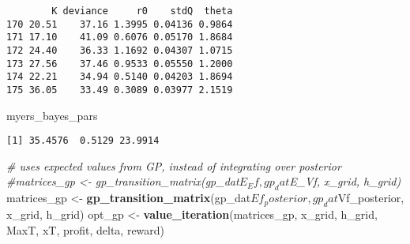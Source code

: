 \documentclass[author-year, review]{elsarticle} %
\newenvironment{Shaded}{}{}
\newcommand{\KeywordTok}[1]{\textcolor[rgb]{0.00,0.44,0.13}{\textbf{{#1}}}}
\newcommand{\DataTypeTok}[1]{\textcolor[rgb]{0.56,0.13,0.00}{{#1}}}
\newcommand{\StringTok}[1]{\textcolor[rgb]{0.25,0.44,0.63}{{#1}}}
\newcommand{\CommentTok}[1]{\textcolor[rgb]{0.38,0.63,0.69}{\textit{{#1}}}}
\newcommand{\NormalTok}[1]{{#1}}
\begin{document}
\begin{verbatim}
        K deviance     r0    stdQ  theta
170 20.51    37.16 1.3995 0.04136 0.9864
171 17.10    41.09 0.6076 0.05170 1.8684
172 24.40    36.33 1.1692 0.04307 1.0715
173 27.56    37.46 0.9533 0.05550 1.2000
174 22.21    34.94 0.5140 0.04203 1.8694
175 36.05    33.49 0.3089 0.03977 2.1519
\end{verbatim}

\begin{Shaded}
\begin{Highlighting}[]
\NormalTok{myers_bayes_pars}
\end{Highlighting}
\end{Shaded}

\begin{verbatim}
[1] 35.4576  0.5129 23.9914
\end{verbatim}

\begin{Shaded}
\end{Shaded}

\begin{Shaded}
\begin{Highlighting}[]
\CommentTok{# uses expected values from GP, instead of integrating over posterior}
\CommentTok{#matrices_gp <- gp_transition_matrix(gp_dat$E_Ef, gp_dat$E_Vf, x_grid, h_grid)}
\NormalTok{matrices_gp <- }\KeywordTok{gp_transition_matrix}\NormalTok{(gp_dat$Ef_posterior, gp_dat$Vf_posterior, x_grid, h_grid) }
\NormalTok{opt_gp <- }\KeywordTok{value_iteration}\NormalTok{(matrices_gp, x_grid, h_grid, MaxT, xT, profit, delta, reward)}
\end{Highlighting}
\end{Shaded}
\end{document}
